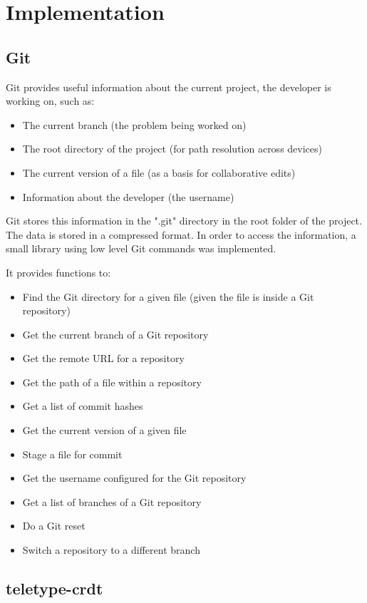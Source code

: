 \chapter{Implementation}

\section{Git}

Git provides useful information about the current project, the developer is working on, such as:
\begin{itemize}
    \item The current branch (the problem being worked on)
    \item The root directory of the project (for path resolution across devices)
    \item The current version of a file (as a basis for collaborative edits)
    \item Information about the developer (the username)
\end{itemize}

Git stores this information in the ".git" directory in the root folder of the project.
The data is stored in a compressed format. In order to access the information, a small library using low level Git commands was implemented. 

It provides functions to:
\begin{itemize}
    \item Find the Git directory for a given file (given the file is inside a Git repository)
    \item Get the current branch of a Git repository
    \item Get the remote URL for a repository
    \item Get the path of a file within a repository
    \item Get a list of commit hashes
    \item Get the current version of a given file
    \item Stage a file for commit
    \item Get the username configured for the Git repository
    \item Get a list of branches of a Git repository
    \item Do a Git reset
    \item Switch a repository to a different branch
\end{itemize}

\section{teletype-crdt}


